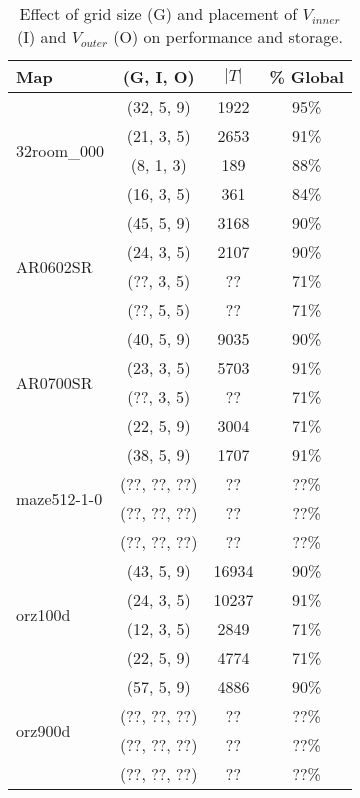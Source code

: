 \begin{table}[tb]
\begin{center}
\begin{tabular}{|l|c|c|c|}
\hline
\textbf{Map} & \textbf{(G, I, O)} & \textbf{$|T|$} & \textbf{\% Global} \\
\hline
\multirow{4}{*}{32room\_000}
 & (32, 5, 9) & 1922 & 95\% \\
 & (21, 3, 5) & 2653 & 91\% \\
 & (8, 1, 3) & 189 & 88\% \\
 & (16, 3, 5) & 361 & 84\% \\
\hline
\multirow{4}{*}{AR0602SR} 
 & (45, 5, 9) & 3168 & 90\% \\
 & (24, 3, 5) & 2107 & 90\% \\
 & (??, 3, 5) & ?? & 71\% \\
 & (??, 5, 5) & ?? & 71\% \\
\hline
\multirow{4}{*}{AR0700SR}
 & (40, 5, 9) & 9035 & 90\%  \\
 & (23, 3, 5) & 5703 & 91\% \\
 & (??, 3, 5) & ??   & 71\% \\
 & (22, 5, 9) & 3004 & 71\% \\
\hline
\multirow{4}{*}{maze512-1-0}
 & (38, 5, 9) & 1707 &  91\% \\
 & (??, ??, ??) & ?? & ??\% \\
 & (??, ??, ??) & ?? & ??\% \\
 & (??, ??, ??) & ?? & ??\% \\
\hline
\multirow{4}{*}{orz100d}
 & (43, 5, 9) & 16934 &  90\% \\
 & (24, 3, 5) & 10237 & 91\% \\
 & (12, 3, 5) & 2849 & 71\% \\
 & (22, 5, 9) & 4774 & 71\% \\
\hline
\multirow{4}{*}{orz900d}
 & (57, 5, 9) & 4886 & 90\% \\
 & (??, ??, ??) & ?? & ??\% \\
 & (??, ??, ??) & ?? & ??\% \\
 & (??, ??, ??) & ?? & ??\% \\
\hline
\end{tabular}
\end{center}
\caption{Effect of grid size (G) and placement of $V_{inner}$ (I) and $V_{outer}$ (O) on performance and storage.}
\label{table:params}
\end{table}
